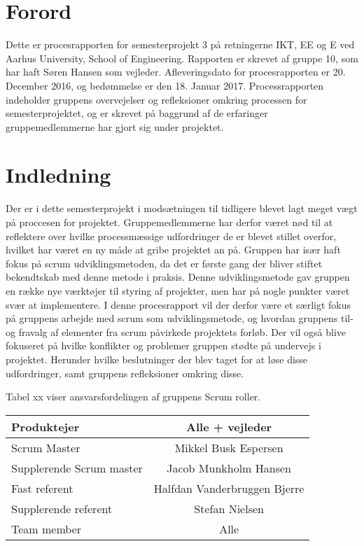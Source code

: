 \chapter{Forord}
Dette er procesrapporten for semesterprojekt 3 på retningerne IKT, EE og E ved Aarhus University, School of Engineering. Rapporten er skrevet af gruppe 10, som
har haft Søren Hansen som vejleder. Afleveringsdato for procesrapporten er 20. December 2016, og bedømmelse er den 18. Januar 2017.
Processrapporten indeholder gruppens overvejelser og refleksioner omkring processen for semesterprojektet, og er skrevet på baggrund af de erfaringer
gruppemedlemmerne har gjort sig under projektet.    

\chapter{Indledning}
Der er i dette semesterprojekt i modsætningen til tidligere blevet lagt meget vægt på proccesen for projektet. Gruppemedlemmerne har derfor været nød til at 
reflektere over hvilke processmæssige udfordringer de er blevet stillet overfor, hvilket har været en ny måde at gribe projektet an på.
Gruppen har især haft fokus på scrum udviklingsmetoden, da det er første gang der bliver stiftet bekendtskab med denne metode i praksis. Denne udviklingsmetode
gav gruppen en række nye værktøjer til styring af projekter, men har på nogle punkter været svær at implementere. I denne procesrapport vil der derfor være et 
særligt fokus på gruppens arbejde med scrum som udviklingsmetode, og hvordan gruppens til- og fravalg af elementer fra scrum påvirkede projektets forløb.
Der vil også blive fokuseret på hvilke konflikter og problemer gruppen stødte på undervejs i projektet. Herunder hvilke beslutninger der blev taget for at 
løse disse udfordringer, samt gruppens refleksioner omkring disse.

Tabel xx viser ansvarsfordelingen af gruppens Scrum roller. \\

\begin{tabular}{| l | c |}
\hline
Produktejer & Alle + vejleder\\\hline
Scrum Master & Mikkel Busk Espersen\\\hline
Supplerende Scrum master & Jacob Munkholm Hansen\\\hline
Fast referent & Halfdan Vanderbruggen Bjerre\\\hline
Supplerende referent & Stefan Nielsen\\\hline
Team member & Alle\\\hline
\end{tabular}

